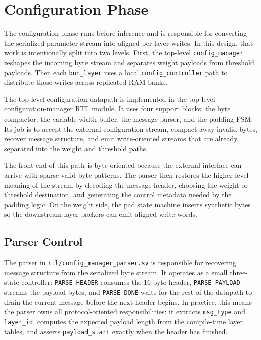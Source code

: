 \section{Configuration Phase}

The configuration phase runs before inference and is responsible for converting
the serialized parameter stream into aligned per-layer writes. In this design,
that work is intentionally split into two levels. First, the top-level
\texttt{config\_manager} reshapes the incoming byte stream and separates weight
payloads from threshold payloads. Then each \texttt{bnn\_layer} uses a local
\texttt{config\_controller} path to distribute those writes across replicated
RAM banks.

The top-level configuration datapath is implemented in the top-level
configuration-manager RTL module. It uses four support blocks: the byte
compactor, the variable-width buffer, the message parser, and the padding FSM.
Its job is to accept the external configuration stream, compact away invalid
bytes, recover message structure, and emit write-oriented streams that are
already separated into the weight and threshold paths.

The front end of this path is byte-oriented because the external interface can
arrive with sparse valid-byte patterns. The parser then restores the higher
level meaning of the stream by decoding the message header, choosing the weight
or threshold destination, and generating the control metadata needed by the
padding logic. On the weight side, the pad state machine inserts synthetic
bytes so the downstream layer packers can emit aligned write words.

\subsection{Parser Control}

The parser in \texttt{rtl/config\_manager\_parser.sv} is responsible for
recovering message structure from the serialized byte stream. It operates as a
small three-state controller: \texttt{PARSE\_HEADER} consumes the 16-byte
header, \texttt{PARSE\_PAYLOAD} streams the payload bytes, and
\texttt{PARSE\_DONE} waits for the rest of the datapath to drain the current
message before the next header begins. In practice, this means the parser owns
all protocol-oriented responsibilities: it extracts \texttt{msg\_type} and
\texttt{layer\_id}, computes the expected payload length from the compile-time
layer tables, and asserts \texttt{payload\_start} exactly when the header has
finished.

